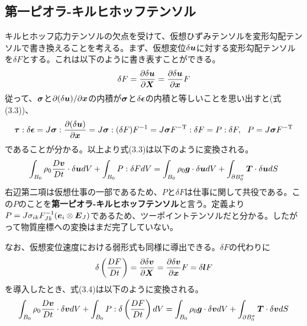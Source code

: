\documentclass[dvipdfmx, 9pt, a4paper]{jsarticle}
\numberwithin{equation}{section}
\newcommand{\bm}[1]{{\mbox{\boldmath $#1$}}}
\begin{document}
\subsection{第一ピオラ-キルヒホッフテンソル}
キルヒホッフ応力テンソルの欠点を受けて、仮想ひずみテンソルを変形勾配テンソルで書き換えることを考える。まず、仮想変位$\delta \bm u$に対する変形勾配テンソルを$\delta F$とする。これは以下のように書き表すことができる。
\begin{equation}
\delta F=\frac{\partial \delta \bm u}{\partial \bm X}=\frac{\partial \delta \bm u}{\partial \bm x}F \notag
\end{equation}
従って、$\bm \sigma$と$\partial(\delta \bm u)/\partial \bm x$の内積が$\bm \sigma$と$\delta \bm \epsilon$の内積と等しいことを思い出すと(式(3.3))、
\begin{equation}
\bm \tau : \delta \bm \epsilon=J\bm \sigma : \frac{\partial(\delta \bm u)}{\partial \bm x}=J\bm \sigma : (\delta F)F^{-1}=J\bm \sigma F^{-\rm T}:\delta F=P:\delta F,~~P=J\bm \sigma F^{-\rm T}
\end{equation}
であることが分かる。以上より式(3.3)は以下のように変換される。
\begin{equation}
\int_{B_0} \rho_0\frac{D\bm v}{Dt}\cdot \delta \bm udV + \int_{B_0}P : \delta F dV=\int_{B_0}\rho_0\bm g\cdot \delta \bm udV+\int_{\partial B_0^\sigma}\bm T\cdot \delta \bm udS
\end{equation}
右辺第二項は仮想仕事の一部であるため、$P$と$\delta F$は仕事に関して共役である。この$P$のことを{\bf 第一ピオラ-キルヒホッフテンソル}と言う。定義より$P=J\sigma_{ik}F^{-1}_{Jk}(\bm e_i \otimes \bm E_J)$であるため、ツーポイントテンソルだと分かる。したがって物質座標への変換はまだ完了していない。\par
なお、仮想変位速度における弱形式も同様に導出できる。$\delta F$の代わりに
\begin{equation}
\delta \left(\frac{DF}{Dt}\right)=\frac{\partial \delta \bm v}{\partial \bm X}=\frac{\partial \delta \bm v}{\partial \bm x}F=\delta \bm lF \notag
\end{equation}
を導入したとき、式(3.4)は以下のように変換される。
\begin{equation}
\int_{B_0} \rho_0\frac{D\bm v}{Dt}\cdot \delta \bm vdV + \int_{B_0}P : \delta \left(\frac{DF}{Dt}\right)  dV=\int_{B_0}\rho_0\bm g\cdot \delta \bm vdV+\int_{\partial B_0^\sigma}\bm T\cdot \delta \bm vdS
\end{equation}
\end{document}
